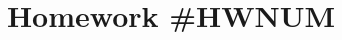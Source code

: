 \documentclass[12pt]{article} %
\title{
    \vspace{2in}
        \textmd{\textbf{\classTitle}}\\
    \vspace{1in}
    \textmd{\textbf{Homework \#HWNUM}}\\
    \vspace{1in}
}
\author{
    \hmwkAuthorName\\
    \hmwkStudentnum
}
\date{}
\begin{document}
\maketitle

\pagebreak
\end{document}
